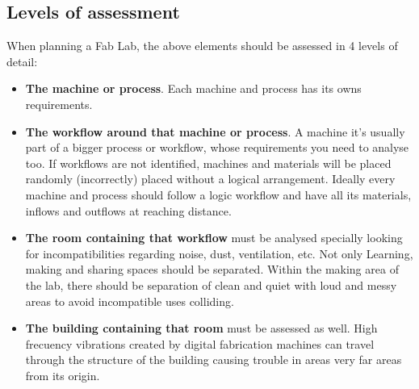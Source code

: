 \documentclass[a4paper,12pt,titlepage]{article}
\begin{document}
\subsection{Levels of assessment}
When planning a Fab Lab, the above elements should be assessed in 4 levels of detail:
\begin{itemize}
\item \textbf{The machine or process}. Each machine and process has its owns requirements.
\item \textbf{The workflow around that machine or process}. A machine it's usually part of a bigger process or workflow, whose requirements you need to analyse too. If workflows
are not identified, machines and materials will be  placed randomly (incorrectly) placed without a
logical arrangement. Ideally every machine and process should follow a logic workflow and
have all its materials, inflows and outflows at reaching distance.

\item \textbf{The room containing that workflow} must be analysed specially looking for incompatibilities regarding noise, dust, ventilation, etc. Not only Learning, making and sharing spaces should be separated. Within the making
area of the lab, there should be separation of clean and quiet with loud and messy areas to avoid incompatible uses colliding.
\item \textbf{The building containing that room} must be assessed as well. High frecuency vibrations created by digital fabrication machines can travel through the structure of the building causing trouble in areas very far areas from its origin.
\end{itemize}
\end{document}
